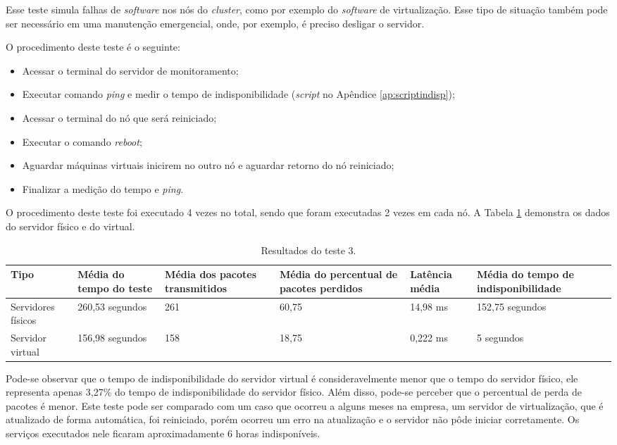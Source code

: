 Esse teste simula falhas de \textit{software} nos nós do \textit{cluster}, como por exemplo do \textit{software} de virtualização. Esse tipo de 
situação também pode ser necessário em uma manutenção emergencial, onde, por exemplo, é preciso desligar o servidor.

O procedimento deste teste é o seguinte:
\begin{itemize}
 \item Acessar o terminal do servidor de monitoramento;
 \item Executar comando \textit{ping} e medir o tempo de indisponibilidade (\textit{script} no Apêndice \ref{ap:scriptindisp});
 \item Acessar o terminal do nó que será reiniciado;
 \item Executar o comando \textit{reboot};
 \item Aguardar máquinas virtuais inicirem no outro nó e aguardar retorno do nó reiniciado;
 \item Finalizar a medição do tempo e \textit{ping}.
\end{itemize}

O procedimento deste teste foi executado 4 vezes no total, sendo que foram executadas 2 vezes em cada nó. A Tabela \ref{tab:teste3resultados}
demonstra os dados do servidor físico e do virtual.

\begin{table}[h!]
\caption{Resultados do teste 3.}
\label{tab:teste3resultados}
\begin{center}
\begin{tabular}{|l|p{2.2cm}|p{2.5cm}|p{2.5cm}|p{1.5cm}|p{3cm}|}\hline
\textbf{Tipo} & \textbf{Média do tempo do teste} & \textbf{Média dos pacotes transmitidos} & \textbf{Média do percentual de pacotes perdidos} & \textbf{Latência média} & \textbf{Média do tempo de indisponibilidade} \\\hline
Servidores físicos & 260,53 segundos & 261 & 60,75 & 14,98 ms & 152,75 segundos \\\hline
Servidor virtual & 156,98 segundos & 158 & 18,75 & 0,222 ms & 5 segundos \\\hline
\end{tabular}
\end{center}
\end{table}

Pode-se observar que o tempo de indisponibilidade do servidor virtual é consideravelmente menor que o tempo do servidor físico, ele representa 
apenas 3,27\% do tempo de indisponibilidade do servidor físico. Além disso, pode-se perceber que o percentual de perda de pacotes é menor.
Este teste pode ser comparado com um caso que ocorreu a alguns meses na empresa, um servidor de virtualização, que é atualizado de forma automática,
foi reiniciado, porém ocorreu um erro na atualização e o servidor não pôde iniciar corretamente. Os serviços executados nele ficaram 
aproximadamente 6 horas indisponíveis.


